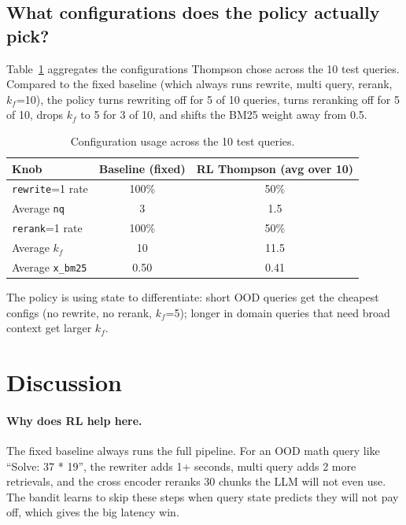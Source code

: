 \documentclass{article}
\begin{document}
\subsection{What configurations does the policy actually pick?}

Table~\ref{tab:armuse} aggregates the configurations Thompson chose across the 10 test queries. Compared to the fixed baseline (which always runs rewrite, multi query, rerank, $k_f$=10), the policy turns rewriting off for 5 of 10 queries, turns reranking off for 5 of 10, drops $k_f$ to 5 for 3 of 10, and shifts the BM25 weight away from 0.5.

\begin{table}[h]
\centering
\caption{Configuration usage across the 10 test queries.}
\label{tab:armuse}
\small
\begin{tabular}{lcc}
\toprule
Knob & Baseline (fixed) & RL Thompson (avg over 10) \\
\midrule
\texttt{rewrite}=1 rate   & 100\% & 50\% \\
Average \texttt{nq}        & 3     & 1.5  \\
\texttt{rerank}=1 rate    & 100\% & 50\% \\
Average $k_f$              & 10    & 11.5 \\
Average \texttt{x\_bm25}   & 0.50  & 0.41 \\
\bottomrule
\end{tabular}
\end{table}

The policy is using state to differentiate: short OOD queries get the cheapest configs (no rewrite, no rerank, $k_f$=5); longer in domain queries that need broad context get larger $k_f$.

\FloatBarrier
\section{Discussion}

\paragraph{Why does RL help here.} The fixed baseline always runs the full pipeline. For an OOD math query like ``Solve: 37 * 19'', the rewriter adds 1+ seconds, multi query adds 2 more retrievals, and the cross encoder reranks 30 chunks the LLM will not even use. The bandit learns to skip these steps when query state predicts they will not pay off, which gives the big latency win.
\end{document}
